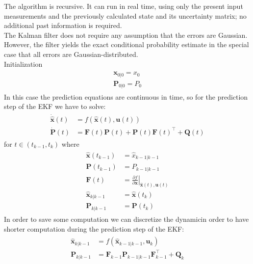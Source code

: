 The algorithm is recursive. It can run in real time, using only the present input measurements and the previously calculated state and its uncertainty matrix; no additional past information is required.\\
The Kalman filter does not require any assumption that the errors are Gaussian. However, the filter yields the exact conditional probability estimate in the special case that all errors are Gaussian-distributed.\\
Initialization
\begin{align}
\begin{split}
\boldsymbol{x}_{0|0} = x_0\\
\boldsymbol{P}_{0|0} = P_0
\end{split}
\end{align}
In this case the prediction equations are continuous in time, so for the prediction step of the EKF we have to solve:
\begin{align}
\begin{split}
\boldsymbol{\dot{\hat{x}}}(t) &= f(\boldsymbol{\hat{x}}(t),\boldsymbol{u}(t)) \\
\boldsymbol{\dot{P}}(t) &= \boldsymbol{F}(t) \boldsymbol{P}(t) + \boldsymbol{P}(t)\boldsymbol{F}(t)^{\top } + \boldsymbol{Q}(t)
\end{split}
\end{align}
for $t \in (t_{k-1}, t_k)$ where
\begin{align}
\begin{split}
\boldsymbol{\hat{x}}(t_{k-1}) &= \hat{x}_{k-1|k-1} \\
\boldsymbol{P}(t_{k-1}) &= P_{k-1|k-1}
\\
{\boldsymbol{F}}(t)&=\left.{\frac  {\partial f}{\partial {\boldsymbol{x}}}}\right\vert _{{{\hat  {{\boldsymbol{x}}}}(t),{\boldsymbol{u}}(t)}}  \\
\boldsymbol{\hat{x}}_{k|k-1} &= \boldsymbol{\hat{x}}(t_{k}) \\
\boldsymbol{P}_{k|k-1} &= \boldsymbol{P}(t_{k})
\end{split}
\end{align}
In order to save some computation we can discretize the dynamicin order to have shorter computation during the prediction step of the EKF:
\begin{align}
\begin{split}
\boldsymbol{\hat{x}}_{k|k-1} &= f(\boldsymbol{\hat{x}}_{k-1|k-1},\boldsymbol{u}_k) \\
\boldsymbol{P}_{k|k-1} &= \boldsymbol{F}_{k-1} \boldsymbol{P}_{k-1|k-1}\boldsymbol{F}_{k-1}^{\top } + \boldsymbol{Q}_{k}
\end{split}
\end{align}
